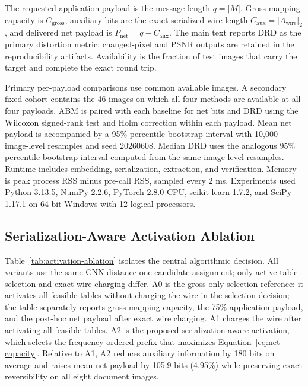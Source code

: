\RevisionAddBegin
The requested application payload is the message length $q=|M|$. Gross mapping
capacity is $C_{\mathrm{gross}}$, auxiliary bits are the exact serialized wire
length $C_{\mathrm{aux}}=|A_{\mathrm{wire}}|_2$, and delivered net payload is
$P_{\mathrm{net}}=q-C_{\mathrm{aux}}$. The main text reports DRD
\cite{Lu2004DRD} as the primary distortion metric; changed-pixel and PSNR
outputs are retained in the reproducibility artifacts. Availability is the
fraction of test images that carry the target and complete the exact round trip.
\RevisionAddEnd

Primary per-payload comparisons use common available images. A secondary fixed
cohort contains the 46 images on which all four methods are available at all
four payloads. ABM is paired with each baseline for net bits and DRD using the
Wilcoxon signed-rank test and Holm correction within each payload. Mean net
payload is accompanied by a 95\% percentile bootstrap interval with 10,000
\RevisionAddBegin
image-level resamples and seed 20260608. Median DRD uses the analogous 95\%
percentile bootstrap interval computed from the same image-level resamples.
Runtime includes embedding,
\RevisionAddEnd
serialization, extraction, and verification. Memory is peak process RSS minus
pre-call RSS, sampled every 2 ms. Experiments used Python 3.13.5, NumPy 2.2.6,
PyTorch 2.8.0 CPU, scikit-learn 1.7.2, and SciPy 1.17.1 on 64-bit Windows with
12 logical processors.

\subsection{Serialization-Aware Activation Ablation}
\label{subsec:component-ablations}

Table~\ref{tab:activation-ablation} isolates the central algorithmic decision.
All variants use the same CNN distance-one candidate assignment; only active
table selection and exact wire charging differ. A0 is the gross-only selection
reference: it activates all feasible tables without charging the wire in the
selection decision; the table separately reports gross mapping capacity, the
75\% application payload, and the post-hoc net payload after exact wire
charging. A1 charges the wire after activating all feasible tables. A2 is the
proposed
serialization-aware activation, which selects the frequency-ordered prefix that
maximizes Equation~\ref{eq:net-capacity}. Relative to A1, A2 reduces auxiliary
information by 180 bits on average and raises mean net payload by 105.9 bits
(4.95\%) while preserving exact reversibility on all eight document images.

